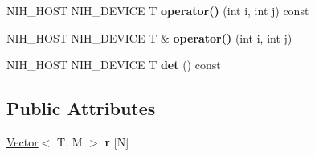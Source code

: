 \begin{DoxyCompactItemize}
\item 
\hypertarget{group__linalg_gae6ddc1c3fb0eb0318233f95e7d382894}{
\-N\-I\-H\-\_\-\-H\-O\-S\-T \-N\-I\-H\-\_\-\-D\-E\-V\-I\-C\-E \-T {\bfseries operator()} (int i, int j) const }
\label{group__linalg_gae6ddc1c3fb0eb0318233f95e7d382894}

\item 
\hypertarget{group__linalg_gaf4a309500232a6e6663faa045fe258d7}{
\-N\-I\-H\-\_\-\-H\-O\-S\-T \-N\-I\-H\-\_\-\-D\-E\-V\-I\-C\-E \-T \& {\bfseries operator()} (int i, int j)}
\label{group__linalg_gaf4a309500232a6e6663faa045fe258d7}

\item 
\hypertarget{group__linalg_ga20d0e32d5bf4cbea9002479abf0d034b}{
\-N\-I\-H\-\_\-\-H\-O\-S\-T \-N\-I\-H\-\_\-\-D\-E\-V\-I\-C\-E \-T {\bfseries det} () const }
\label{group__linalg_ga20d0e32d5bf4cbea9002479abf0d034b}

\end{DoxyCompactItemize}
\subsection*{\-Public \-Attributes}
\begin{DoxyCompactItemize}
\item 
\hypertarget{group__linalg_ga412525ee29436819434578b8dbd60a1e}{
\hyperlink{structnih_1_1_vector}{\-Vector}$<$ \-T, \-M $>$ {\bfseries r} \mbox{[}\-N\mbox{]}}
\label{group__linalg_ga412525ee29436819434578b8dbd60a1e}

\end{DoxyCompactItemize}

